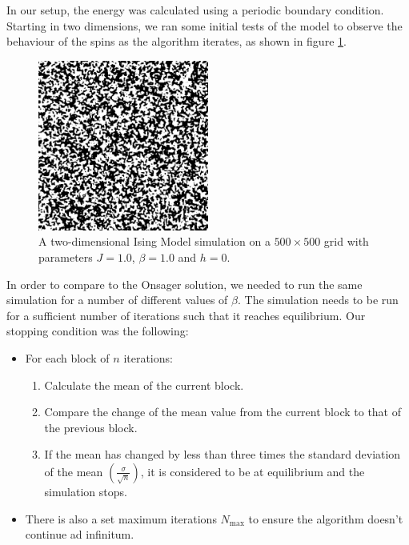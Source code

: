 \documentclass[11pt]{article}
\begin{document}
	In our setup, the energy was calculated using a periodic boundary condition. Starting in two dimensions, we ran some initial tests of the model to observe the behaviour of the spins as the algorithm iterates, as shown in figure \ref{fig:ising_grid}.
	\begin{figure}[H]
		\begin{center}
			\includegraphics[width=0.5\textwidth]{./img/ising-simulation.png}
		\end{center}
		\caption{A two-dimensional Ising Model simulation on a $500\times 500$ grid with parameters $J = 1.0$, $\beta = 1.0$ and $h = 0$.}
		\label{fig:ising_grid}
	\end{figure}
	
	In order to compare to the Onsager solution, we needed to run the same simulation for a number of different values of $\beta$. The simulation needs to be run for a sufficient number of iterations such that it reaches equilibrium. Our stopping condition was the following:
	\begin{itemize}
		\item For each block of $n$ iterations:
		\begin{enumerate}
			\item Calculate the mean of the current block.
			\item Compare the change of the mean value from the current block to that of the previous block.
			\item If the mean has changed by less than three times the standard deviation of the mean $\displaystyle\left(\frac{\sigma}{\sqrt{n}}\right)$, it is considered to be at equilibrium and the simulation stops.
		\end{enumerate}
		\item There is also a set maximum iterations $N_\text{max}$ to ensure the algorithm doesn't continue ad infinitum.
	\end{itemize}
	
\end{document}
